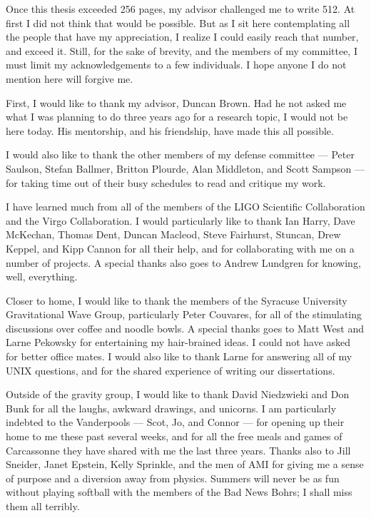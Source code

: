 Once this thesis exceeded 256 pages, my advisor challenged me to write 512. At
first I did not think that would be possible. But as I sit here contemplating
all the people that have my appreciation, I realize I could easily reach that
number, and exceed it. Still, for the sake of brevity, and the members of my
committee, I must limit my acknowledgements to a few individuals. I hope anyone
I do not mention here will forgive me.

First, I would like to thank my advisor, Duncan Brown. Had he not asked me what
I was planning to do three years ago for a research topic, I would not be here
today. His mentorship, and his friendship, have made this all possible.

I would also like to thank the other members of my defense committee --- Peter
Saulson, Stefan Ballmer, Britton Plourde, Alan Middleton, and Scott Sampson ---
for taking time out of their busy schedules to read and critique my work.

I have learned much from all of the members of the LIGO Scientific
Collaboration and the Virgo Collaboration. I would particularly like to thank
Ian Harry, Dave McKechan, Thomas Dent, Duncan Macleod, Steve Fairhurst,
Stuncan, Drew Keppel, and Kipp Cannon for all their help, and for collaborating
with me on a number of projects. A special thanks also goes to Andrew Lundgren
for knowing, well, everything.

Closer to home, I would like to thank the members of the Syracuse University
Gravitational Wave Group, particularly Peter Couvares, for all of the
stimulating discussions over coffee and noodle bowls. A special thanks goes to
Matt West and Larne Pekowsky for entertaining my hair-brained ideas. I could
not have asked for better office mates. I would also like to thank Larne for
answering all of my UNIX questions, and for the shared experience of writing
our dissertations.

Outside of the gravity group, I would like to thank David Niedzwieki and Don
Bunk for all the laughs, awkward drawings, and unicorns. I am particularly
indebted to the Vanderpools --- Scot, Jo, and Connor --- for opening up their
home to me these past several weeks, and for all the free meals and games of
Carcassonne they have shared with me the last three years. Thanks also to Jill
Sneider, Janet Epstein, Kelly Sprinkle, and the men of AMI for giving me a
sense of purpose and a diversion away from physics. Summers will never be as
fun without playing softball with the members of the Bad News Bohrs; I shall
miss them all terribly.

